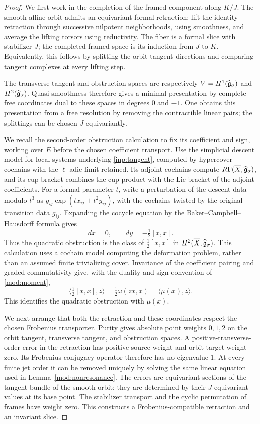 \begin{proof}
We first work in the completion of the framed component along $K/J$.
The smooth affine orbit admits an equivariant formal retraction:
lift the identity retraction through successive nilpotent
neighborhoods, using smoothness, and average the lifting torsors
using reductivity. The fiber is a formal slice with stabilizer $J$;
the completed framed space is its induction from $J$ to $K$.
Equivalently, this follows by splitting the orbit tangent directions
and comparing tangent complexes at every lifting step.

The transverse tangent and obstruction spaces are respectively
$V=H^1(\widehat{\mathfrak g}_\sigma)$ and $H^2(\widehat{\mathfrak g}_\sigma)$. Quasi-smoothness
therefore gives a minimal presentation by complete free coordinates
dual to these spaces in degrees $0$ and $-1$. One obtains this
presentation from a free resolution by removing the contractible
linear pairs; the splittings can be chosen $J$-equivariantly.

We recall the second-order obstruction calculation to fix its coefficient
and sign, working over $E$ before the chosen coefficient transport.
Use the simplicial descent model for local systems underlying
\eqref{inp:tangent}, computed by hypercover cochains with the
$\ell$-adic limit retained. Its adjoint cochains compute
$R\Gamma(\overline X,\widehat{\mathfrak g}_\sigma)$, and its cup bracket combines the
cup product with the Lie bracket of the adjoint coefficients. For a
formal parameter $t$, write a perturbation of the descent data modulo
$t^3$ as $g_{ij}\exp(t x_{ij}+t^2 y_{ij})$, with the cochains twisted by
the original transition data $g_{ij}$. Expanding the cocycle equation
by the Baker--Campbell--Hausdorff formula gives
\[
 dx=0,\qquad dy=-\tfrac12[x,x].
\]
Thus the quadratic obstruction is the class of $\tfrac12[x,x]$ in
$H^2(\overline X,\widehat{\mathfrak g}_\sigma)$. This calculation uses a cochain model
computing the deformation problem, rather than an assumed finite
trivializing cover. Invariance of the coefficient pairing and graded
commutativity give, with the duality and sign convention of
\eqref{mod:moment},
\[
 \bigl\langle\tfrac12[x,x],z\bigr\rangle
       =\tfrac12\omega(zx,x)=\langle\mu(x),z\rangle.
\]
This identifies the quadratic obstruction with $\mu(x)$.

We next arrange that both the retraction and these coordinates respect
the chosen Frobenius transporter. Purity gives absolute point
weights $0,1,2$ on the orbit tangent, transverse tangent, and
obstruction spaces. A positive-transverse-order error in the
retraction has positive source weight and orbit target weight zero.
Its Frobenius conjugacy operator therefore has no eigenvalue $1$.
At every finite jet order it can be removed uniquely by solving the
same linear equation used in Lemma~\ref{mod:nonresonance}. The errors
are equivariant sections of the tangent bundle of the smooth orbit;
they are determined by their $J$-equivariant values at its base point.
The stabilizer transport and the cyclic permutation of frames have
weight zero. This constructs a Frobenius-compatible retraction and
an invariant slice.


\end{proof}
